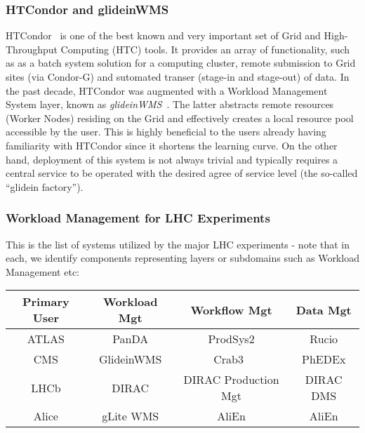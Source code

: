 \subsubsection{HTCondor and glideinWMS}
\label{htcondor}
HTCondor~\cite{htcondor} is one of the best known and  very important set of Grid and High-Throughput Computing (HTC) tools. It provides an array of functionality, such as
as a batch system solution for a computing cluster, remote submission to Grid sites (via Condor-G) and sutomated transer (stage-in and stage-out) of data.
In the past decade, HTCondor was augmented with a  Workload Management System layer, known as \textit{glideinWMS}~\cite{glideinwms}. The latter abstracts remote resources (Worker Nodes)
residing on the Grid and effectively creates a local resource pool accessible by the user. This is highly beneficial to the users already having familiarity with HTCondor since it shortens the learning curve.
On the other hand, deployment of this system is not always trivial and typically requires a central service to be operated with the desired agree of service level (the so-called ``glidein factory'').

\subsubsection{Workload Management for LHC Experiments}
This is the list of systems utilized by the major LHC experiments - note that in each, we identify components representing layers or subdomains such as Workload Management etc:

\begin{center}
  \begin{tabular}{ c | c | c | c }
    \hline
    \textbf{Primary User} & \textbf{Workload Mgt} & \textbf{Workflow Mgt} & \textbf{Data Mgt}\\ \hline \hline
    ATLAS & PanDA & ProdSys2 & Rucio\\ \hline
    CMS  & GlideinWMS & Crab3~\cite{crab3_chep12} & PhEDEx\\ \hline
    LHCb  & DIRAC & DIRAC Production Mgt & DIRAC DMS\\ \hline
    Alice  & gLite WMS & AliEn & AliEn\\ 
    \hline
  \end{tabular}
\end{center}

